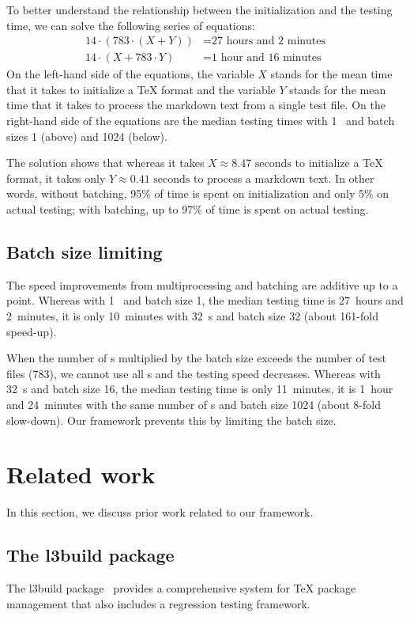 \documentclass[final]{ltugboat}
\begin{document}
To better understand the relationship between the initialization and the testing time, we can solve the following series of equations:
\begin{align*}
    14\cdot(783\cdot(X + Y)) &= \text{27 hours and 2 minutes} \\
    14\cdot(X + 783\cdot Y) &= \text{1 hour and 16 minutes}
\end{align*}
On the left-hand side of the equations, the variable $X$ stands for the mean time that it takes to initialize a \TeX{} format and the variable $Y$ stands for the mean time that it takes to process the markdown text from a single test file. On the right-hand side of the equations are the median testing times with 1~ and batch sizes 1 (above) and 1024 (below).

The solution shows that whereas it takes $X\approx\text{8.47 seconds}$ to initialize a \TeX{} format, it takes only $Y\approx\text{0.41 seconds}$ to process a markdown text. In other words, without batching, 95\% of time is spent on initialization and only 5\% on actual testing; with batching, up to 97\% of time is spent on actual testing.

\subsection{Batch size limiting}
The speed improvements from multiprocessing and batching are additive up to a point. Whereas with 1~ and batch size 1, the median testing time is 27~hours and 2~minutes, it is only 10~minutes with 32~s and batch size 32 (about 161-fold speed-up).

When the number of s multiplied by the batch size exceeds the number of test files (783), we cannot use all s and the testing speed decreases. Whereas with 32~s and batch size 16, the median testing time is only 11~minutes, it is 1~hour and 24~minutes with the same number of s and batch size 1024 (about 8-fold slow-down). Our framework prevents this by limiting the batch size.

\section{Related work}
\label{sec:related-work}

In this section, we discuss prior work related to our framework.

\subsection{The l3build package}
The l3build package~\cite{mittelbach2014l3build, wright2015automating, wright2022l3build, latex2023l3build} provides a comprehensive system for \TeX{} package management that also includes a regression testing framework.
\end{document}

